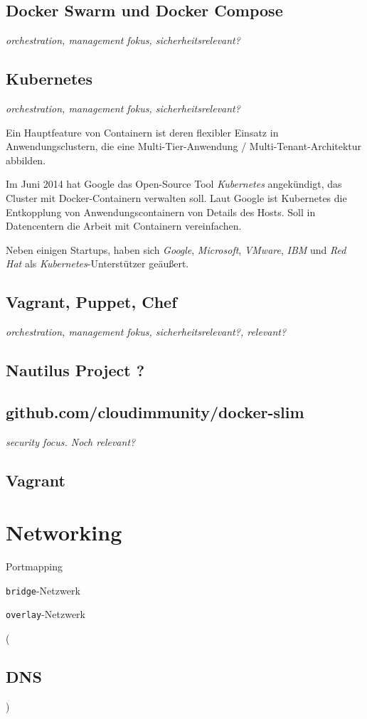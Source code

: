 \documentclass[../main.tex]{subfiles}
\begin{document}


    \subsection{Docker Swarm und Docker Compose}
      \emph{orchestration, management fokus, sicherheitsrelevant?}
    \subsection{Kubernetes}
      \emph{orchestration, management fokus, sicherheitsrelevant?}

      Ein Hauptfeature von Containern ist deren flexibler Einsatz in Anwendungsclustern, die eine Multi-Tier-Anwendung / Multi-Tenant-Architektur abbilden.

      Im Juni 2014 hat Google das Open-Source Tool \emph{Kubernetes} angekündigt, das Cluster mit Docker-Containern verwalten soll. Laut Google ist Kubernetes die Entkopplung von Anwendungscontainern von Details des Hosts.
      Soll in Datencentern die Arbeit mit Containern vereinfachen.

      Neben einigen Startups, haben sich \emph{Google}, \emph{Microsoft}, \emph{VMware}, \emph{IBM} und \emph{Red Hat} als \emph{Kubernetes}-Unterstützer geäußert.
    \subsection{Vagrant, Puppet, Chef}
      \emph{orchestration, management fokus, sicherheitsrelevant?, relevant?}
    \subsection{Nautilus Project ?}
    \subsection{github.com/cloudimmunity/docker-slim}
      \emph{security focus. Noch relevant?}
    \subsection{Vagrant}
	\section{Networking}
    Portmapping

    \texttt{bridge}-Netzwerk

    \texttt{overlay}-Netzwerk

    (\subsection{DNS})
\end{document}
